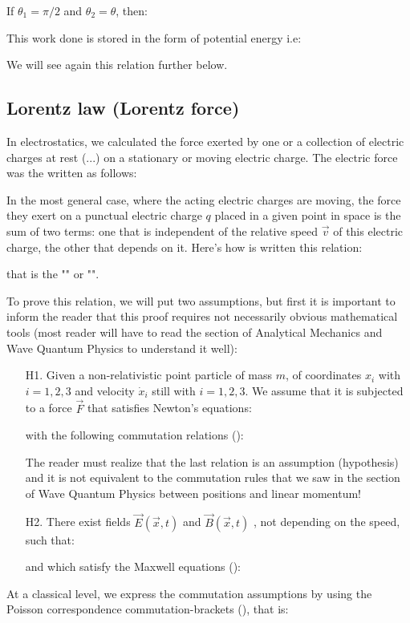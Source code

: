 	If $\theta_1=\pi/2$ and $\theta_2=\theta$, then:
	
	This work done is stored in the form of potential energy i.e:
	
	We will see again this relation further below.
	
	\pagebreak
	\subsection{Lorentz law (Lorentz force)}\label{lorentz force}
	In electrostatics, we calculated the force exerted by one or a collection of electric charges at rest (...) on a stationary or moving electric charge. The electric force was the written as follows:
	
	In the most general case, where the acting electric charges are moving, the force they exert on a punctual electric charge $q$ placed in a given point in space is the sum of two terms: one that is independent of the relative speed $\vec{v}$ of this electric charge, the other that depends on it. Here's how is written this relation:
	
	that is the "" or "".
	
	To prove this relation, we will put two assumptions, but first it is important to inform the reader that this proof requires not necessarily obvious mathematical tools (most reader will have to read the section of Analytical Mechanics and Wave Quantum Physics to understand it well):
	\begin{enumerate}
		\item[H1.] Given a non-relativistic point particle of mass $m$, of coordinates $x_i$ with $i=1,2,3$ and velocity $\dot{x}_i$ still with $i=1,2,3$. We assume that it is subjected to a force $\vec{F}$ that satisfies Newton's equations:
		
		with the following commutation relations ():
		
	 	The reader must realize that the last relation is an assumption (hypothesis) and it is not equivalent to the commutation rules that we saw in the section of Wave Quantum Physics between positions and linear momentum!

		\item[H2.] There exist fields $\vec{E}(\vec{x},t)$ and $\vec{B}(\vec{x},t)$ , not depending on the speed, such that:
		
		and which satisfy the Maxwell equations ():
		
	\end{enumerate}
	At a classical level, we express the commutation assumptions by using the Poisson correspondence commutation-brackets (), that is:
	
